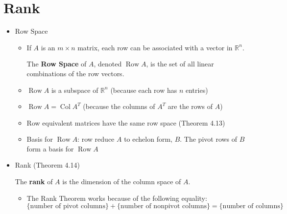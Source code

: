 \documentclass[10pt]{book}
\newenvironment{boxdef}{\begin{mdframed}[backgroundcolor=gray!30,linewidth=0pt,nobreak=true]}{\end{mdframed}}
\newcommand{\R}{\mathbb{R}}
\DeclareMathOperator{\Col}{Col}
\DeclareMathOperator{\Row}{Row}
\begin{document}
\section{Rank}
\begin{itemize}
	\item Row Space
		\begin{itemize}
			\item If $A$ is an $m\times n$ matrix, each row can be associated with a vector in $\R^n$.
			\begin{boxdef}
				The \textbf{Row Space} of $A$, denoted $\Row A$, is the set of all linear combinations of the row vectors.
			\end{boxdef}
			\item $\Row A$ is a subspace of $\R^n$ (because each row has $n$ entries)
			\item $\Row A = \Col A^T$ (because the columns of $A^T$ are the rows of $A$)
			\item Row equivalent matrices have the same row space (Theorem 4.13)
			\item Basis for $\Row A$: row reduce $A$ to echelon form, $B$. The pivot rows of $B$ form a basis for $\Row A$
		\end{itemize}
	\item Rank (Theorem 4.14)
		\begin{boxdef}
			The \textbf{rank} of $A$ is the dimension of the column space of $A$.
		\end{boxdef}
		\begin{itemize}
			\item The Rank Theorem works because of the following equality:
			$$ \{\text{number of pivot columns}\} + \{\text{number of nonpivot columns}\} = \{\text{number of columns}\}$$
		\end{itemize}
\end{itemize}
\end{document}
